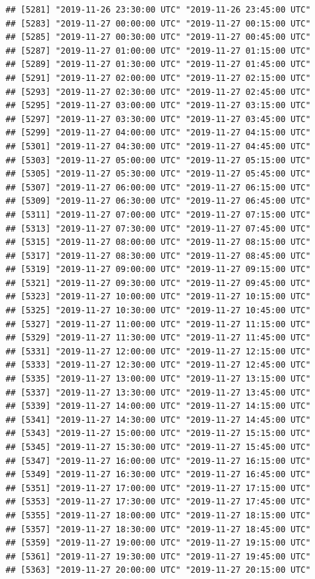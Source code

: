 \documentclass{article}\usepackage[]{graphicx}\usepackage[]{color}
\makeatletter
\newenvironment{kframe}{%
 \def\at@end@of@kframe{}%
 \ifinner\ifhmode%
  \def\at@end@of@kframe{\end{minipage}}%
  \begin{minipage}{\columnwidth}%
 \fi\fi%
 \def\FrameCommand##1{\hskip\@totalleftmargin \hskip-\fboxsep
 \colorbox{shadecolor}{##1}\hskip-\fboxsep
     \hskip-\linewidth \hskip-\@totalleftmargin \hskip\columnwidth}%
 \MakeFramed {\advance\hsize-\width
   \@totalleftmargin\z@ \linewidth\hsize
   \@setminipage}}%
 {\par\unskip\endMakeFramed%
 \at@end@of@kframe}
\newenvironment{knitrout}{}{} %
\makeatother
\begin{document}
\begin{knitrout}
\begin{kframe}
\begin{verbatim}
## [5281] "2019-11-26 23:30:00 UTC" "2019-11-26 23:45:00 UTC"
## [5283] "2019-11-27 00:00:00 UTC" "2019-11-27 00:15:00 UTC"
## [5285] "2019-11-27 00:30:00 UTC" "2019-11-27 00:45:00 UTC"
## [5287] "2019-11-27 01:00:00 UTC" "2019-11-27 01:15:00 UTC"
## [5289] "2019-11-27 01:30:00 UTC" "2019-11-27 01:45:00 UTC"
## [5291] "2019-11-27 02:00:00 UTC" "2019-11-27 02:15:00 UTC"
## [5293] "2019-11-27 02:30:00 UTC" "2019-11-27 02:45:00 UTC"
## [5295] "2019-11-27 03:00:00 UTC" "2019-11-27 03:15:00 UTC"
## [5297] "2019-11-27 03:30:00 UTC" "2019-11-27 03:45:00 UTC"
## [5299] "2019-11-27 04:00:00 UTC" "2019-11-27 04:15:00 UTC"
## [5301] "2019-11-27 04:30:00 UTC" "2019-11-27 04:45:00 UTC"
## [5303] "2019-11-27 05:00:00 UTC" "2019-11-27 05:15:00 UTC"
## [5305] "2019-11-27 05:30:00 UTC" "2019-11-27 05:45:00 UTC"
## [5307] "2019-11-27 06:00:00 UTC" "2019-11-27 06:15:00 UTC"
## [5309] "2019-11-27 06:30:00 UTC" "2019-11-27 06:45:00 UTC"
## [5311] "2019-11-27 07:00:00 UTC" "2019-11-27 07:15:00 UTC"
## [5313] "2019-11-27 07:30:00 UTC" "2019-11-27 07:45:00 UTC"
## [5315] "2019-11-27 08:00:00 UTC" "2019-11-27 08:15:00 UTC"
## [5317] "2019-11-27 08:30:00 UTC" "2019-11-27 08:45:00 UTC"
## [5319] "2019-11-27 09:00:00 UTC" "2019-11-27 09:15:00 UTC"
## [5321] "2019-11-27 09:30:00 UTC" "2019-11-27 09:45:00 UTC"
## [5323] "2019-11-27 10:00:00 UTC" "2019-11-27 10:15:00 UTC"
## [5325] "2019-11-27 10:30:00 UTC" "2019-11-27 10:45:00 UTC"
## [5327] "2019-11-27 11:00:00 UTC" "2019-11-27 11:15:00 UTC"
## [5329] "2019-11-27 11:30:00 UTC" "2019-11-27 11:45:00 UTC"
## [5331] "2019-11-27 12:00:00 UTC" "2019-11-27 12:15:00 UTC"
## [5333] "2019-11-27 12:30:00 UTC" "2019-11-27 12:45:00 UTC"
## [5335] "2019-11-27 13:00:00 UTC" "2019-11-27 13:15:00 UTC"
## [5337] "2019-11-27 13:30:00 UTC" "2019-11-27 13:45:00 UTC"
## [5339] "2019-11-27 14:00:00 UTC" "2019-11-27 14:15:00 UTC"
## [5341] "2019-11-27 14:30:00 UTC" "2019-11-27 14:45:00 UTC"
## [5343] "2019-11-27 15:00:00 UTC" "2019-11-27 15:15:00 UTC"
## [5345] "2019-11-27 15:30:00 UTC" "2019-11-27 15:45:00 UTC"
## [5347] "2019-11-27 16:00:00 UTC" "2019-11-27 16:15:00 UTC"
## [5349] "2019-11-27 16:30:00 UTC" "2019-11-27 16:45:00 UTC"
## [5351] "2019-11-27 17:00:00 UTC" "2019-11-27 17:15:00 UTC"
## [5353] "2019-11-27 17:30:00 UTC" "2019-11-27 17:45:00 UTC"
## [5355] "2019-11-27 18:00:00 UTC" "2019-11-27 18:15:00 UTC"
## [5357] "2019-11-27 18:30:00 UTC" "2019-11-27 18:45:00 UTC"
## [5359] "2019-11-27 19:00:00 UTC" "2019-11-27 19:15:00 UTC"
## [5361] "2019-11-27 19:30:00 UTC" "2019-11-27 19:45:00 UTC"
## [5363] "2019-11-27 20:00:00 UTC" "2019-11-27 20:15:00 UTC"

\end{verbatim}
\end{kframe}
\end{knitrout}
\end{document}
